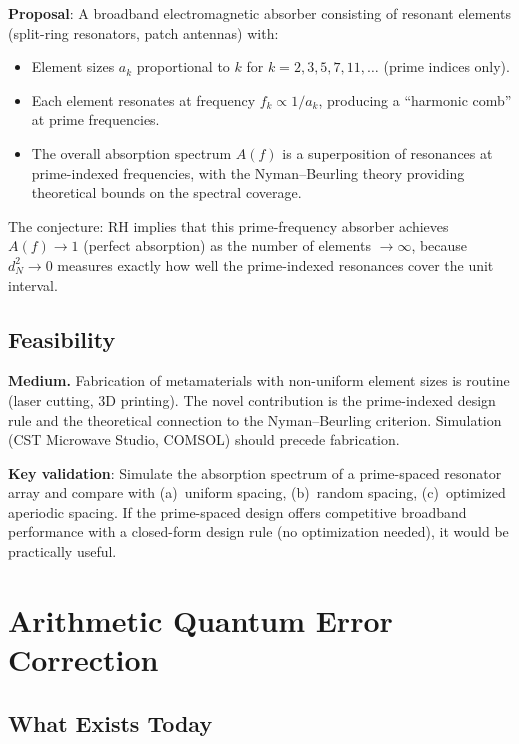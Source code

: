 \documentclass[11pt,a4paper]{article}
\begin{document}
\textbf{Proposal}: A broadband electromagnetic absorber consisting
of resonant elements (split-ring resonators, patch antennas) with:
\begin{itemize}
  \item Element sizes $a_k$ proportional to $k$ for
    $k = 2, 3, 5, 7, 11, \ldots$  (prime indices only).
  \item Each element resonates at frequency $f_k \propto 1/a_k$,
    producing a ``harmonic comb'' at prime frequencies.
  \item The overall absorption spectrum $A(f)$ is a superposition
    of resonances at prime-indexed frequencies, with the
    Nyman--Beurling theory providing theoretical bounds on the
    spectral coverage.
\end{itemize}

The conjecture: RH implies that this prime-frequency absorber
achieves $A(f) \to 1$ (perfect absorption) as the number of
elements $\to \infty$, because $d_N^2 \to 0$ measures exactly
how well the prime-indexed resonances cover the unit interval.

\subsection{Feasibility}

\textbf{Medium.} Fabrication of metamaterials with non-uniform
element sizes is routine (laser cutting, 3D printing). The novel
contribution is the prime-indexed design rule and the theoretical
connection to the Nyman--Beurling criterion. Simulation (CST
Microwave Studio, COMSOL) should precede fabrication.

\textbf{Key validation}: Simulate the absorption spectrum of a
prime-spaced resonator array and compare with (a)~uniform spacing,
(b)~random spacing, (c)~optimized aperiodic spacing. If the
prime-spaced design offers competitive broadband performance with
a closed-form design rule (no optimization needed), it would be
practically useful.

\section{Arithmetic Quantum Error Correction}
\label{sec:qec}

\subsection{What Exists Today}
\end{document}
